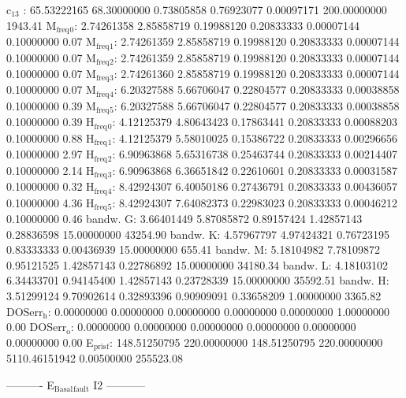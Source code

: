 \documentclass[11pt]{article}
\begin{document}
c\(_{\text{13}}\)    :  65.53222165  68.30000000   0.73805858   0.76923077   0.00097171 200.00000000      1943.41
M\(_{\text{freq}}\)\(_{\text{0}}\):   2.74261358   2.85858719   0.19988120   0.20833333   0.00007144   0.10000000         0.07
M\(_{\text{freq}}\)\(_{\text{1}}\):   2.74261359   2.85858719   0.19988120   0.20833333   0.00007144   0.10000000         0.07
M\(_{\text{freq}}\)\(_{\text{2}}\):   2.74261359   2.85858719   0.19988120   0.20833333   0.00007144   0.10000000         0.07
M\(_{\text{freq}}\)\(_{\text{3}}\):   2.74261360   2.85858719   0.19988120   0.20833333   0.00007144   0.10000000         0.07
M\(_{\text{freq}}\)\(_{\text{4}}\):   6.20327588   5.66706047   0.22804577   0.20833333   0.00038858   0.10000000         0.39
M\(_{\text{freq}}\)\(_{\text{5}}\):   6.20327588   5.66706047   0.22804577   0.20833333   0.00038858   0.10000000         0.39
H\(_{\text{freq}}\)\(_{\text{0}}\):   4.12125379   4.80643423   0.17863441   0.20833333   0.00088203   0.10000000         0.88
H\(_{\text{freq}}\)\(_{\text{1}}\):   4.12125379   5.58010025   0.15386722   0.20833333   0.00296656   0.10000000         2.97
H\(_{\text{freq}}\)\(_{\text{2}}\):   6.90963868   5.65316738   0.25463744   0.20833333   0.00214407   0.10000000         2.14
H\(_{\text{freq}}\)\(_{\text{3}}\):   6.90963868   6.36651842   0.22610601   0.20833333   0.00031587   0.10000000         0.32
H\(_{\text{freq}}\)\(_{\text{4}}\):   8.42924307   6.40050186   0.27436791   0.20833333   0.00436057   0.10000000         4.36
H\(_{\text{freq}}\)\(_{\text{5}}\):   8.42924307   7.64082373   0.22983023   0.20833333   0.00046212   0.10000000         0.46
bandw. G:   3.66401449   5.87085872   0.89157424   1.42857143   0.28836598  15.00000000     43254.90
bandw. K:   4.57967797   4.97424321   0.76723195   0.83333333   0.00436939  15.00000000       655.41
bandw. M:   5.18104982   7.78109872   0.95121525   1.42857143   0.22786892  15.00000000     34180.34
bandw. L:   4.18103102   6.34433701   0.94145400   1.42857143   0.23728339  15.00000000     35592.51
bandw. H:   3.51299124   9.70902614   0.32893396   0.90909091   0.33658209   1.00000000      3365.82
DOSerr\(_{\text{h}}\):   0.00000000   0.00000000   0.00000000   0.00000000   0.00000000   1.00000000         0.00
DOSerr\(_{\text{o}}\):   0.00000000   0.00000000   0.00000000   0.00000000   0.00000000   0.00000000         0.00
E\(_{\text{pris}}\)\(_{\text{f}}\): 148.51250795 220.00000000 148.51250795 220.00000000 5110.46151942   0.00500000    255523.08


----------     E\(_{\text{Basal}}\)\(_{\text{fault}}\) I2     -----------
\end{document}
